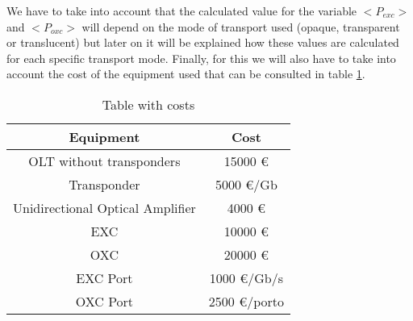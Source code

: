 \vspace{10pt}
We have to take into account that the calculated value for the variable $<P_{exc}>$ and $<P_{oxc}>$ will depend on the mode of transport used (opaque, transparent or translucent) but later on it will be explained how these values are calculated for each specific transport mode.
Finally, for this we will also have to take into account the cost of the equipment used that can be consulted in table \ref{table_cost_analytical}.\\

\begin{table}[h!]
\centering
\begin{tabular}{|| c | c||}
 \hline
 Equipment & Cost \\
 \hline\hline
 OLT without transponders & 15000 \euro \\
 Transponder & 5000 \euro/Gb \\
 Unidirectional Optical Amplifier & 4000 \euro \\
 EXC & 10000 \euro \\
 OXC & 20000 \euro \\
 EXC Port & 1000 \euro /Gb/s\\
 OXC Port & 2500 \euro /porto \\
 \hline
\end{tabular}
\caption{Table with costs}
\label{table_cost_analytical}
\end{table}

